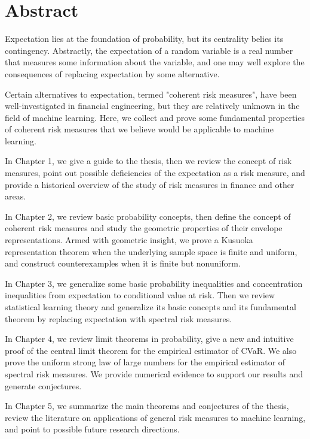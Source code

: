 \chapter*{Abstract}\label{abstract}



Expectation lies at the foundation of probability, but its centrality belies its contingency. Abstractly, the expectation of a random variable is a real number that measures some information about the variable, and one may well explore the consequences of replacing expectation by some alternative.

Certain alternatives to expectation, termed "coherent risk measures", have been well-investigated in financial engineering, but they are relatively unknown in the field of machine learning. Here, we collect and prove some fundamental properties of coherent risk measures that we believe would be applicable to machine learning.

In Chapter 1, we give a guide to the thesis, then we review the concept of risk measures, point out possible deficiencies of the expectation as a risk measure, and provide a historical overview of the study of risk measures in finance and other areas.

In Chapter 2, we review basic probability concepts, then define the concept of coherent risk measures and study the geometric properties of their envelope representations. Armed with geometric insight, we prove a Kusuoka representation theorem when the underlying sample space is finite and uniform, and construct counterexamples when it is finite but nonuniform.

In Chapter 3, we generalize some basic probability inequalities and concentration inequalities from expectation to conditional value at risk. Then we review statistical learning theory and generalize its basic concepts and its fundamental theorem by replacing expectation with spectral risk measures.

In Chapter 4, we review limit theorems in probability, give a new and intuitive proof of the central limit theorem for the empirical estimator of CVaR. We also prove the uniform strong law of large numbers for the empirical estimator of spectral risk measures. We provide numerical evidence to support our results and generate conjectures.

In Chapter 5, we summarize the main theorems and conjectures of the thesis, review the literature on applications of general risk measures to machine learning, and point to possible future research directions.